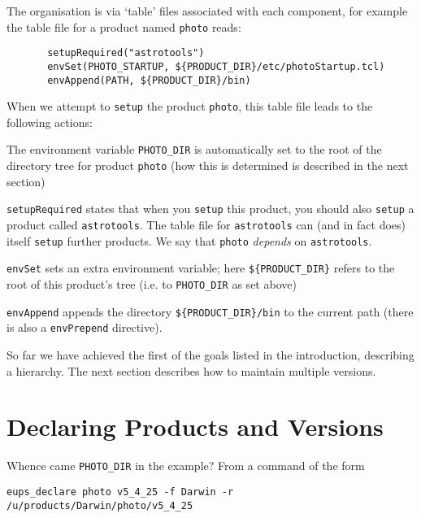 \documentclass{article}
\newcommand{\code}[1]{\texttt{#1}}
\begin{document}
The organisation is via `table' files
associated with each component, for example the table file
for a product named \code{photo} reads:
\begin{verbatim}
       setupRequired("astrotools")
       envSet(PHOTO_STARTUP, ${PRODUCT_DIR}/etc/photoStartup.tcl)
       envAppend(PATH, ${PRODUCT_DIR}/bin)
\end{verbatim}

When we attempt to \code{setup} the product \code{photo}, this
table file leads to the following actions:
\begin{description}
\item
  The environment variable \code{PHOTO\_DIR} is automatically set to 
  the root of the directory tree for product \code{photo} (how this
  is determined is described in the next section)
\item
  \code{setupRequired} states that when you \code{setup} this product, you
  should also \code{setup} a product called \code{astrotools}.
  The table file for \code{astrotools} can
  (and in fact does) itself \code{setup} further products.  We say that
  \code{photo} \emph{depends} on \code{astrotools}.
\item
  \code{envSet} sets an extra environment variable; here \code{\$\{PRODUCT\_DIR\}}
  refers to the root of this product's tree (i.e. to \code{PHOTO\_DIR} as set above)
\item
  \code{envAppend} appends
  the directory \code{\$\{PRODUCT\_DIR\}/bin} to the current path (there
  is also a \code{envPrepend} directive).
\end{description}

So far we have achieved the first of the goals listed in the introduction,
describing a hierarchy.  The next section describes how to maintain
multiple versions.

\section{Declaring Products and Versions}

Whence came \code{PHOTO\_DIR} in the example? From a command of the form
\begin{verbatim}
eups_declare photo v5_4_25 -f Darwin -r /u/products/Darwin/photo/v5_4_25
\end{verbatim}
\end{document}
